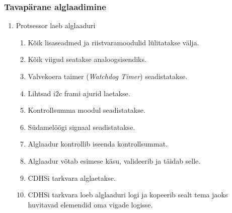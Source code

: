 \documentclass[12pt,a4paper]{article}
\begin{document}
\subsubsection{Tavapärane alglaadimine}
\label{sec:usecase:default}
\begin{enumerate}
\item Protsessor laeb alglaaduri
	\begin{enumerate}
	\item Kõik lisaseadmed ja riistvaramoodulid lülitatakse välja.
	\item Kõik viigud seatakse analoogsisendiks.
	\item Valvekoera taimer (\textit{Watchdog Timer}) seadistatakse.
	\item Lihtsad \gls{i2c} \gls{fram}i ajurid laetakse.
	\item Kontrollsumma moodul seadistatakse.
	\item Südamelöögi signaal seadistatakse.
	\item Alglaadur kontrollib iseenda kontrollsummat.
	\item Alglaadur võtab esimese käsu, valideerib ja täidab selle.
	\item CDHSi tarkvara alglaetakse.
	\item CDHSi tarkvara loeb alglaaduri logi ja kopeerib sealt tema jaoks
		huvitavad elemendid oma vigade logisse.
	\end{enumerate}
\end{enumerate}
\end{document}
